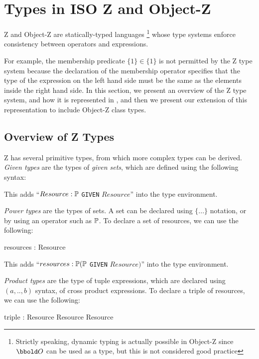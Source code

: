 \section{Types in ISO Z and Object-Z}

Z and Object-Z are statically-typed languages
\footnote{Strictly speaking, dynamic typing is actually possible in
Object-Z since $\oid$ can be used as a type, but this is not considered
good practice} whose type systems 
enforce consistency between operators and expressions.

For example, the membership predicate $\{1\}
\in \{1\}$ is not permitted by the Z type system because the 
declaration of the membership operator
specifies that the type of the expression on the left hand side
must be the same as the elements inside the right hand side. In this
section, we present an overview of the Z type system, and how it is
represented in \theStandard, and then we present our extension of this
representation to include Object-Z class types.

\subsection{Overview of Z Types}

Z has several primitive types, from which more complex types can be
derived. {\em Given types} are the types of {\em given sets}, which are
defined using the following syntax:
\begin{zed}
  [Resource]
\end{zed}

This adds ``$Resource : \power$ {\tt GIVEN} $Resource$'' into the type
environment.

{\em Power types} are the types of sets. A set can be declared using
$\{...\}$ notation, or by using an operator such as $\power$. To
declare a set of resources, we can use the following:
\begin{axdef}
  resources : \power Resource
\end{axdef}

This adds ``$resources : \power (\power$ {\tt GIVEN}
$Resource)$'' into the type environment.

{\em Product types} are the type of tuple expressions, which are
declared using $(a, .., b)$ syntax, of cross product expressions. To
declare a triple of resources, we can use the following:
\begin{axdef}
   triple : Resource \cross Resource \cross Resource
\end{axdef}

